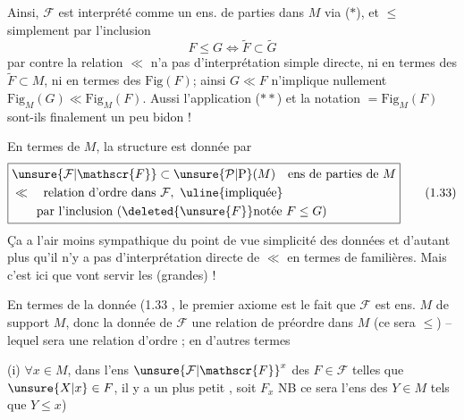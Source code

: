 Ainsi, $\mathcal{F}$ est interprété comme un ens. de parties dans $M$ via ($*$), et $\leq$  simplement par l'inclusion
\[
F\leq G\Longleftrightarrow\widetilde F\subset\widetilde G
\tag*{(1.32)}
\]
par contre la relation $\ll$ n'a pas d'interprétation simple directe, ni en termes des  $\widetilde F\subset M$, ni en termes des  $\mathrm{Fig}(F)$; ainsi $G\ll F$ n'implique nullement $\mathrm{Fig}_{M}(G)\ll\mathrm{Fig}_{M}(F)$. Aussi l'application ($**$) et la notation $=\mathrm{Fig}_{M}(F)$ sont-ils finalement un peu bidon !

En termes de $M$, la structure est donnée par
\[
\boxed{\begin{aligned}
&\unsure{\mathcal{F}|\mathscr{F}}\subset\unsure{\mathcal{P}|\mathrm{P}}(M)\quad\text{ens de parties de }M\\
&\ll\quad\text{relation d'ordre dans }\mathcal{F},\ \text{\uline{impliquée}}\\
&\qquad\text{par l'inclusion }(\deleted{\unsure{F}}\text{notée }F\leq G)
\end{aligned}}
\tag*{(1.33)}
\]
Ça a l'air moins sympathique du point de vue simplicité des données et d'autant plus qu'il n'y a pas  d'interprétation directe de $\ll$ en termes de   familières. Mais c'est ici que vont servir les (grandes)  !

En termes de la  donnée (1.33\unsure{)|]} , le  premier axiome est  le fait que $\mathcal{F}$ est  ens.   $M$ de
 support $M$,  donc la donnée de
$\mathcal{F}$   une relation de préordre dans $M$ (ce sera $\leq$) -- lequel sera
une relation d'ordre ; en d'autres termes

(i) $\forall x\in M$, dans l'ens ${\unsure{\mathcal{F}|\mathscr{F}}}^{x}$ des $F\in\mathcal{F}$ telles que $\unsure{X|x}\in F$, il y a un plus petit , soit $F_{x}$ \unsure{[|(}NB ce sera l'ens des $Y\in M$ tels que $Y\leq x$)

